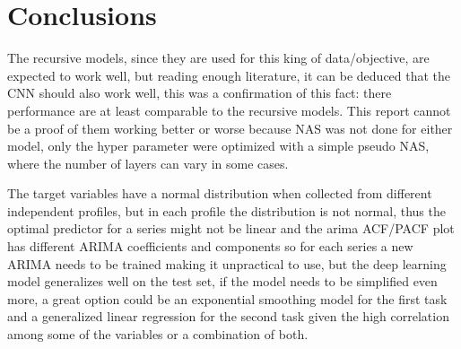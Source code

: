 \section{Conclusions}
The recursive models, since they are used for this king of data/objective, are expected to work well, but reading enough literature\cite{cnn_time}\cite{cnn_time_2}, it can be deduced that the CNN should also work well, this was a confirmation of this fact: there performance are at least comparable to the recursive models.
This report cannot be a proof of them working better or worse because NAS was not done for either model, only the hyper parameter were optimized with a simple pseudo NAS, where the number of layers can vary in some cases.

The target variables have a normal distribution when collected from different independent profiles, but in each profile the distribution is not normal, thus the optimal predictor for  a series might not be linear and the arima ACF/PACF plot has different ARIMA coefficients and components so for each series a new ARIMA needs to be trained making it unpractical to use, but the deep learning model generalizes well on the test set, if the model needs to be simplified even more, a great option could be an exponential smoothing model for the first task and a generalized linear regression for the second task given the high correlation among some of the variables or a combination of both.

